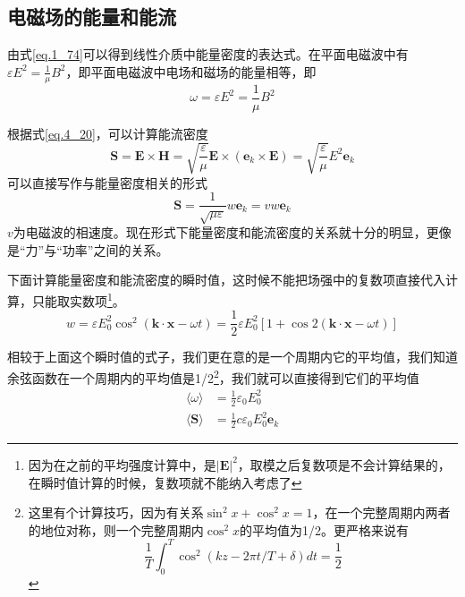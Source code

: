     \subsection{电磁场的能量和能流}      
        由式\ref{eq.1_74}可以得到线性介质中能量密度的表达式。在平面电磁波中有$\varepsilon E^2 =\frac{1}{\mu}B^2$，即平面电磁波中电场和磁场的能量相等，即
        \begin{equation}
            \omega = \varepsilon E^2 =\frac{1}{\mu}B^2
        \end{equation}

        根据式\ref{eq.4_20}，可以计算能流密度
        \begin{equation}
            \boldsymbol{S}=\boldsymbol{E} \times \boldsymbol{H}=\sqrt{\frac{\varepsilon}{\mu}} \boldsymbol{E} \times\left(\boldsymbol{e}_{k} \times \boldsymbol{E}\right)=\sqrt{\frac{\varepsilon}{\mu}} E^{2} \boldsymbol{e}_{k}
        \end{equation}
        可以直接写作与能量密度相关的形式
        \begin{equation}
            \boxed{\boldsymbol{S}=\frac{1}{\sqrt{\mu \varepsilon}} w \boldsymbol{e}_{k}=v w \boldsymbol{e}_{k}}
        \end{equation}
        $v$为电磁波的相速度。现在形式下能量密度和能流密度的关系就十分的明显，更像是“力”与“功率”之间的关系。

        下面计算能量密度和能流密度的瞬时值，这时候不能把场强中的复数项直接代入计算，只能取实数项\footnote{因为在之前的平均强度计算中，是$|\boldsymbol{E}|^2$，取模之后复数项是不会计算结果的，在瞬时值计算的时候，复数项就不能纳入考虑了}。
        \begin{equation}
            w=\varepsilon E_{0}^{2} \cos ^{2}(\boldsymbol{k} \cdot \boldsymbol{x}-\omega t)=\frac{1}{2} \varepsilon E_{0}^{2}[1+\cos 2(\boldsymbol{k} \cdot \boldsymbol{x}-\omega t)]
        \end{equation}
        
        相较于上面这个瞬时值的式子，我们更在意的是一个周期内它的平均值，我们知道余弦函数在一个周期内的平均值是1/2\footnote{这里有个计算技巧，因为有关系$\sin^2 x + \cos^2 x =1 $，在一个完整周期内两者的地位对称，则一个完整周期内$\cos^2 x$的平均值为1/2。更严格来说有\[\frac{1}{T} \int_{0}^{T} \cos ^{2}(k z-2 \pi t / T+\delta) d t=\frac{1}{2}\]}，我们就可以直接得到它们的平均值
        \begin{equation}
            \boxed{\begin{aligned}
            \langle \omega \rangle &=\frac{1}{2} \varepsilon_{0} E_{0}^{2} \\
            \langle\boldsymbol{S}\rangle &=\frac{1}{2} c \varepsilon_{0} E_{0}^{2} \boldsymbol{e}_k
            \end{aligned}}
        \end{equation}

